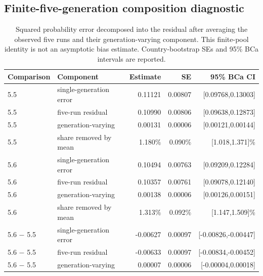 \subsection{Finite-five-generation composition diagnostic}
\begin{table}[!htbp]\centering\small
\caption{Squared probability error decomposed into the residual after averaging the observed five runs and their generation-varying component. This finite-pool identity is not an asymptotic bias estimate. Country-bootstrap SEs and 95\% BCa intervals are reported.}\label{tab:composition}
\begin{tabular}{llrrr}\toprule
\rowcolor{tablehead} Comparison & Component & Estimate & SE & 95\% BCa CI \\\midrule
5.5 & single-generation error & 0.11121 & 0.00807 & [0.09768,0.13003] \\
5.5 & five-run residual & 0.10990 & 0.00806 & [0.09638,0.12873] \\
5.5 & generation-varying & 0.00131 & 0.00006 & [0.00121,0.00144] \\
5.5 & share removed by mean & 1.180\% & 0.090\% & [1.018,1.371]\% \\
5.6 & single-generation error & 0.10494 & 0.00763 & [0.09209,0.12284] \\
5.6 & five-run residual & 0.10357 & 0.00761 & [0.09078,0.12140] \\
5.6 & generation-varying & 0.00138 & 0.00006 & [0.00126,0.00151] \\
5.6 & share removed by mean & 1.313\% & 0.092\% & [1.147,1.509]\% \\
5.6 $-$ 5.5 & single-generation error & -0.00627 & 0.00097 & [-0.00826,-0.00447] \\
5.6 $-$ 5.5 & five-run residual & -0.00633 & 0.00097 & [-0.00834,-0.00452] \\
5.6 $-$ 5.5 & generation-varying & 0.00007 & 0.00006 & [-0.00004,0.00018] \\
\bottomrule\end{tabular}\end{table}
